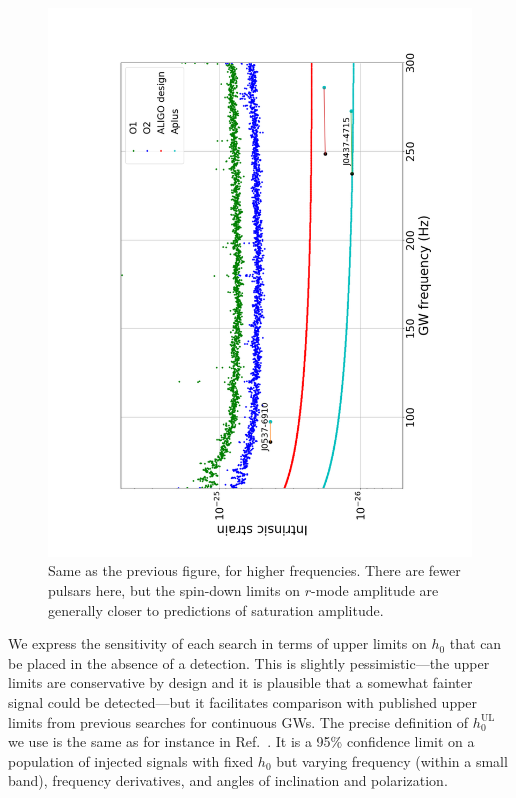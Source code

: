 \documentclass{ttuthes2007}
\begin{document}
\begin{figure}
\includegraphics[angle=270,width=\linewidth]{figure/rmeth2}
\caption{
\label{fig2}
Same as the previous figure, for higher frequencies.
There are fewer pulsars here, but the spin-down limits on $r$-mode amplitude
are generally closer to predictions of saturation amplitude.
}
\end{figure}

We express the sensitivity of each search in terms of upper limits on $h_0$
that can be placed in the absence of a detection.
This is slightly pessimistic---the upper limits are conservative by design and
it is plausible that a somewhat fainter signal could be detected---but it
facilitates comparison with published upper limits from previous searches for
continuous \acp{GW}.
The precise definition of $h_0^\mathrm{UL}$ we use is the same as for instance
in Ref.~\cite{Abbott:2018qee}.
It is a 95\% confidence limit on a population of injected signals with fixed
$h_0$ but varying frequency (within a small band), frequency derivatives, and
angles of inclination and polarization.
\end{document}
